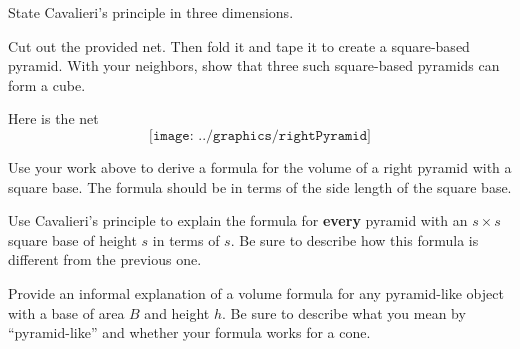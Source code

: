 \begin{prob}
State Cavalieri's principle in three dimensions.  
\end{prob}
\vspace{.25in}


%
%
%

\begin{prob}
Cut out the provided net.  Then fold it and tape it to create a square-based pyramid.  With your neighbors, show that three such square-based pyramids can form a cube.  
\end{prob}
\begin{teachingnote}
Here is the net
\[
\texttt{[image: ../graphics/rightPyramid]}
\]
\end{teachingnote}

\begin{prob}
Use your work above to derive a formula for the volume of a
right pyramid with a square base. The formula should be in terms of
the side length of the square base.
\end{prob}

\begin{prob}
Use Cavalieri's principle to explain the formula for \textbf{every} pyramid with an $s\times s$ square base of height $s$ in terms of $s$.  Be sure to describe how this formula is different from the previous one.  
\end{prob}

\begin{prob}
Provide an informal explanation of a volume formula for any pyramid-like object with a base of area $B$ and height $h$.  Be sure to describe what you mean by ``pyramid-like'' and whether your formula works for a cone.  
\end{prob}

